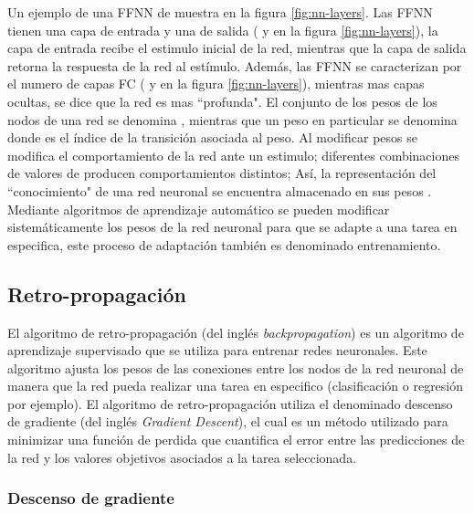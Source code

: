 Un ejemplo de una FFNN de muestra en la figura \ref{fig:nn-layers}. Las FFNN tienen una capa de entrada y una de salida ( y  en la figura \ref{fig:nn-layers}), la capa de entrada recibe el estimulo inicial de la red, mientras que la capa de salida retorna la respuesta de la red al estímulo. Además, las FFNN se caracterizan por el numero de capas FC ( y  en la figura \ref{fig:nn-layers}), mientras mas capas ocultas, se dice que la red es mas ``profunda". El conjunto de los pesos de los nodos de una red se denomina \jim{\theta}, mientras que un peso en particular se denomina  donde  es el índice de la transición asociada al peso. Al modificar pesos \jim{\theta} se modifica el comportamiento de la red ante un estimulo; diferentes combinaciones de valores de \jim{\theta} producen comportamientos distintos; Así, la representación del ``conocimiento" de una red neuronal se encuentra almacenado en sus pesos \jim{\theta}. Mediante algoritmos de aprendizaje automático se pueden modificar sistemáticamente los pesos de la red neuronal para que se adapte a una tarea en especifica, este proceso de adaptación \cite{Gurney1997} también es denominado entrenamiento.

\subsection{Retro-propagación}

El algoritmo de retro-propagación (del inglés \textit{backpropagation}) es un algoritmo de aprendizaje supervisado que se utiliza para entrenar redes neuronales. Este algoritmo ajusta los pesos de las conexiones entre los nodos de la red neuronal de manera que la red pueda realizar una tarea en especifico (clasificación o regresión por ejemplo). El algoritmo de retro-propagación utiliza el denominado descenso de gradiente (del inglés \textit{Gradient Descent}), el cual es un método utilizado para minimizar una función de perdida que cuantifica el error entre las predicciones de la red y los valores objetivos asociados a la tarea seleccionada.

\subsubsection{Descenso de gradiente}

